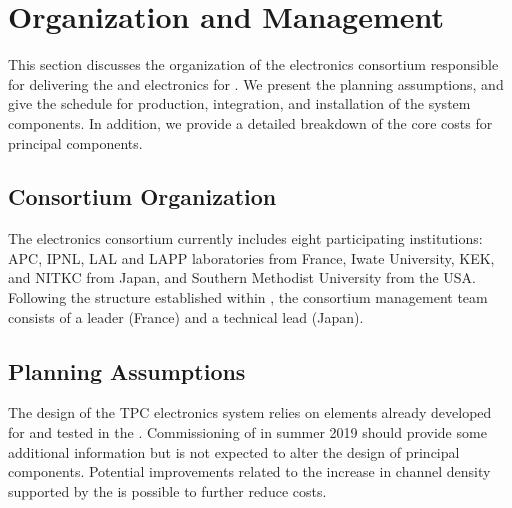 \section{Organization and Management}
\label{sec:dp-tpcelec-org}
This section discusses the organization of the   electronics consortium responsible for delivering the  and  electronics for . We present the planning assumptions, and give the schedule for production, integration, and installation of the system components. In addition, we provide a detailed breakdown of the core costs for principal components. %


\subsection{Consortium Organization}
\label{ssec:dp-tpcelec-org-consortium}
The \dual {} electronics consortium currently includes 
eight participating institutions: APC, IPNL, LAL and LAPP laboratories from France, Iwate University, KEK, and NITKC from Japan, and Southern Methodist University from the  USA. Following the structure established within , the consortium management team consists of a leader (France) and a technical lead (Japan). 


\subsection{Planning Assumptions}
\label{ssec:dp-tpcelec-org-assmp}
The design of the \dual TPC electronics system relies on elements already developed for  and tested in the .  Commissioning of  in summer 2019 should provide some additional information but is not expected to alter the design of principal components. Potential improvements related to the increase in channel density supported by the   is possible to further reduce costs. 

